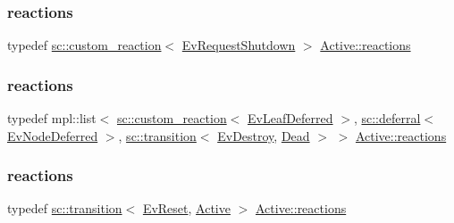 \subsubsection{\texorpdfstring{reactions}{reactions}\hspace{0.1cm}{\footnotesize\ttfamily [1/4]}}
{\footnotesize\ttfamily typedef \mbox{\hyperlink{classboost_1_1statechart_1_1custom__reaction}{sc\+::custom\+\_\+reaction}}$<$ \mbox{\hyperlink{struct_ev_request_shutdown}{Ev\+Request\+Shutdown}} $>$ \mbox{\hyperlink{struct_active_a628dd827d0faf3cd002f59a8d17f189d}{Active\+::reactions}}}

\mbox{\label{struct_active_a3f41c16a9522a432b7c51738621d8650}} 
\subsubsection{\texorpdfstring{reactions}{reactions}\hspace{0.1cm}{\footnotesize\ttfamily [2/4]}}
{\footnotesize\ttfamily typedef mpl\+::list$<$ \mbox{\hyperlink{classboost_1_1statechart_1_1custom__reaction}{sc\+::custom\+\_\+reaction}}$<$ \mbox{\hyperlink{struct_ev_leaf_deferred}{Ev\+Leaf\+Deferred}} $>$, \mbox{\hyperlink{classboost_1_1statechart_1_1deferral}{sc\+::deferral}}$<$ \mbox{\hyperlink{struct_ev_node_deferred}{Ev\+Node\+Deferred}} $>$, \mbox{\hyperlink{classboost_1_1statechart_1_1transition}{sc\+::transition}}$<$ \mbox{\hyperlink{struct_ev_destroy}{Ev\+Destroy}}, \mbox{\hyperlink{struct_dead}{Dead}} $>$ $>$ \mbox{\hyperlink{struct_active_a628dd827d0faf3cd002f59a8d17f189d}{Active\+::reactions}}}

\mbox{\label{struct_active_a86282569cdd6a34df7d2580364c79857}} 
\subsubsection{\texorpdfstring{reactions}{reactions}\hspace{0.1cm}{\footnotesize\ttfamily [3/4]}}
{\footnotesize\ttfamily typedef \mbox{\hyperlink{classboost_1_1statechart_1_1transition}{sc\+::transition}}$<$ \mbox{\hyperlink{struct_ev_reset}{Ev\+Reset}}, \mbox{\hyperlink{struct_active}{Active}} $>$ \mbox{\hyperlink{struct_active_a628dd827d0faf3cd002f59a8d17f189d}{Active\+::reactions}}}


